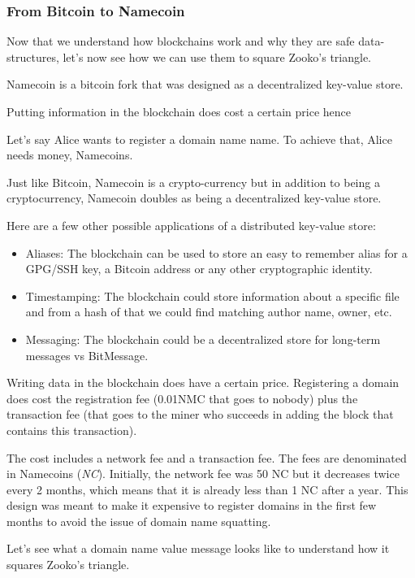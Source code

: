 \documentclass{vldb}
\begin{document}
\subsubsection{From Bitcoin to Namecoin}

Now that we understand how blockchains work and why they are safe data-structures, let's now see how we can use them to square Zooko's triangle. 

Namecoin is a bitcoin fork that was designed as a decentralized key-value store.

Putting information in the blockchain does cost a certain price hence

Let's say Alice wants to register a domain name name. To achieve that, Alice needs money, Namecoins.  

Just like Bitcoin, Namecoin is a crypto-currency but in addition to being a cryptocurrency, Namecoin doubles as being a decentralized key-value store.

Here are a few other possible applications of a distributed key-value store:
\begin{itemize}
\item Aliases: The blockchain can be used to store an easy to remember alias for a GPG/SSH key, a Bitcoin address or any other cryptographic identity.
\item Timestamping: The blockchain could store information about a specific file and from a hash of that we could find matching author name, owner, etc.
\item Messaging: The blockchain could be a decentralized store for  long-term messages vs BitMessage.
\end{itemize}

Writing data in the blockchain does have a certain price. Registering a domain does cost the registration fee (0.01NMC that goes to nobody) plus the transaction fee (that goes to the miner who succeeds in adding the block that contains this transaction).

The cost includes a network fee and a transaction fee. The fees are denominated in Namecoins (\emph{NC}). Initially, the network fee was 50 NC but it decreases twice every 2 months, which means that it is already less than 1 NC after a year. This design was meant to make it expensive to register domains in the first few months to avoid the issue of domain name squatting.

Let's see what a domain name value message looks like to understand how it squares Zooko's triangle.
\end{document}

